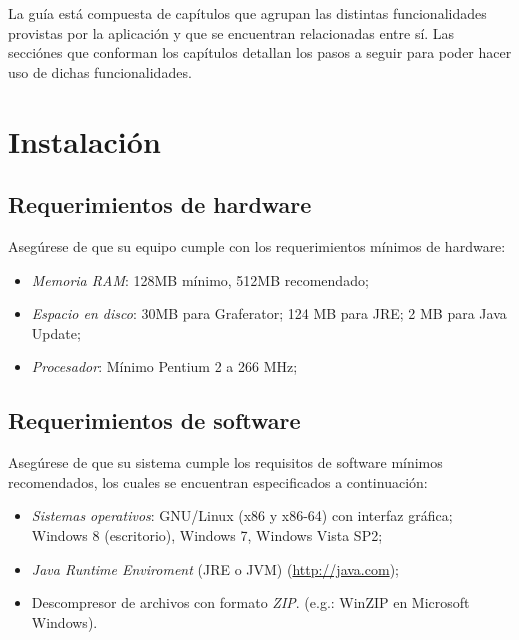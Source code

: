 \documentclass{book}
\begin{document}
La guía está compuesta de capítulos que agrupan las distintas funcionalidades provistas por la aplicación y que se encuentran relacionadas entre sí. Las secciónes que conforman los capítulos detallan los pasos a seguir para poder hacer uso de dichas funcionalidades.



\tableofcontents
\newpage
\thispagestyle{empty}
\thispagestyle{empty}
\thispagestyle{empty}




%
%
\chapter{Instalación}


\section{Requerimientos de hardware}

	Asegúrese de que su equipo cumple con los requerimientos mínimos de hardware:
	\medskip

	\begin{itemize}
		\renewcommand{\labelitemi}{\scriptsize\tiny$\blacksquare$} 
		\itemsep=5pt \topsep=0pt \partopsep=0pt \parskip=0pt \parsep=0pt

		\item \textit{Memoria RAM}: 128MB mínimo, 512MB recomendado;
		\item \textit{Espacio en disco}: 30MB para Graferator; 124 MB para JRE; 2 MB para Java Update; 
		\item \textit{Procesador}: Mínimo Pentium 2 a 266 MHz;

	\end{itemize}
\bigskip


\section{Requerimientos de software}

Asegúrese de que su sistema cumple los requisitos de software mínimos recomendados, los cuales se encuentran especificados a continuación:
	\medskip

	\begin{itemize}
		\renewcommand{\labelitemi}{\scriptsize\tiny$\blacksquare$} 
		\itemsep=5pt \topsep=0pt \partopsep=0pt \parskip=0pt \parsep=0pt

		\item \textit{Sistemas operativos}: GNU/Linux (x86 y x86-64) con interfaz gráfica; Windows 8 (escritorio), Windows 7, Windows Vista SP2;

		\item \textit{Java Runtime Enviroment} (JRE o JVM) (\url{http://java.com});

		\item Descompresor de archivos con formato \textit{ZIP}. (e.g.: WinZIP en Microsoft Windows).

	\end{itemize}
\bigskip
\end{document}
